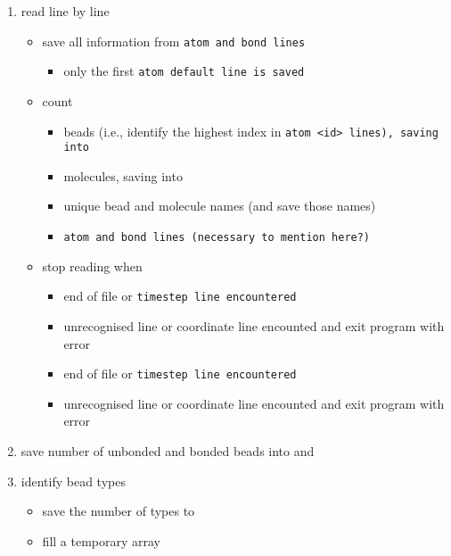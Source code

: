 \begin{enumerate}
  \item read  line by line
    \begin{itemize}
      \item save all information from \tt{atom} and \tt{bond} lines
        \begin{itemize}
          \item only the first \tt{atom default} line is saved
        \end{itemize}
      \item count
        \begin{itemize}
          \item beads (i.e., identify the highest index in \tt{atom <id>}
            lines), saving into 
          \item molecules, saving into 
          \item unique bead and molecule names (and save those names)
          \item \tt{atom} and \tt{bond} lines (\TODO necessary to mention here?)
        \end{itemize}
      \item stop reading when
        \begin{itemize}
          \item end of file or \tt{timestep} line encountered
          \item unrecognised line or coordinate line encounted and exit program
            with error
        \end{itemize}
        \begin{itemize}
          \item end of file or \tt{timestep} line encountered
          \item unrecognised line or coordinate line encounted and exit program
            with error
        \end{itemize}
    \end{itemize}
  \item save number of unbonded and bonded beads into  and
  \item identify bead types
    \begin{itemize}
      \item save the number of types to 
      \item fill a temporary  array
    \end{itemize}

\end{enumerate}
